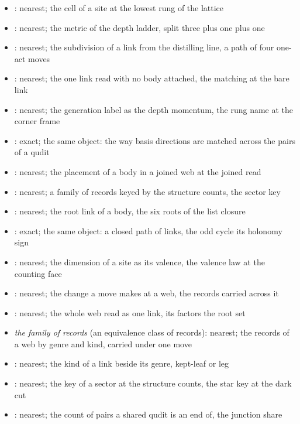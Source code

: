 \begin{chtheorem}
\begin{itemize}
\item {}: nearest; the cell of a site at the lowest rung of the lattice
\item {}: nearest; the metric of the depth ladder, split three plus one plus one
\item {}: nearest; the subdivision of a link from the distilling line, a path of four one-act moves
\item {}: nearest; the one link read with no body attached, the matching at the bare link
\item {}: nearest; the generation label as the depth momentum, the rung name at the corner frame
\item {}: exact; the same object: the way basis directions are matched across the pairs of a qudit
\item {}: nearest; the placement of a body in a joined web at the joined read
\item {}: nearest; a family of records keyed by the structure counts, the sector key
\item {}: nearest; the root link of a body, the six roots of the list closure
\item {}: exact; the same object: a closed path of links, the odd cycle its holonomy sign
\item {}: nearest; the dimension of a site as its valence, the valence law at the counting face
\item {}: nearest; the change a move makes at a web, the records carried across it
\item {}: nearest; the whole web read as one link, its factors the root set
\item \emph{the family of records} (an equivalence class of records): nearest; the records of a web by genre and kind, carried under one move
\item {}: nearest; the kind of a link beside its genre, kept-leaf or leg
\item {}: nearest; the key of a sector at the structure counts, the star key at the dark cut
\item {}: nearest; the count of pairs a shared qudit is an end of, the junction share
\end{itemize}
\end{chtheorem}
